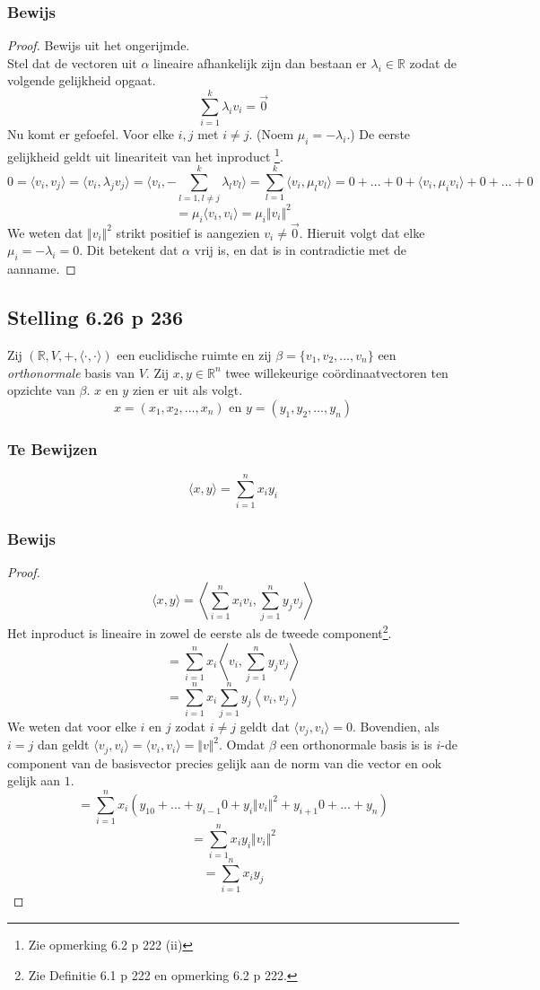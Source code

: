 \documentclass[lineaire_algebra_oplossingen.tex]{subfiles}
\begin{document}
\subsubsection*{Bewijs}
\begin{proof}
Bewijs uit het ongerijmde.\\
Stel dat de vectoren uit $\alpha$ lineaire afhankelijk zijn dan bestaan er $\lambda_i \in \mathbb{R}$ zodat de volgende gelijkheid opgaat.
\[
\sum_{i=1}^k \lambda_iv_i = \vec{0}
\]
Nu komt er gefoefel. Voor elke $i, j$ met $i\neq j$. (Noem $\mu_i =-\lambda_i $.)
De eerste gelijkheid geldt uit lineariteit van het inproduct \footnote{Zie opmerking 6.2 p 222 (ii)}.
\[
0 = \langle v_i, v_j \rangle = \langle v_i, \lambda_jv_j \rangle = \langle v_i, -\sum_{l=1, l\neq j}^k \lambda_lv_l \rangle = \sum_{l= 1}^k\langle v_i, \mu_lv_l\rangle = 0 + ... + 0 + \langle v_i,\mu_i v_i\rangle + 0 + ... + 0
\]
\[
= \mu_i \langle v_i,v_i\rangle = \mu_i \Vert v_i\Vert^2
\]
We weten dat $\Vert v_i\Vert^2$ strikt positief is aangezien $v_i \neq \vec{0}$. Hieruit volgt dat elke $\mu_i = -\lambda_i = 0$. Dit betekent dat $\alpha$ vrij is, en dat is in contradictie met de aanname.
\end{proof}

\subsection{Stelling 6.26 p 236}
Zij $(\mathbb{R}, V,+, \langle \cdot,\cdot \rangle)$ een euclidische ruimte en zij $\beta = \{v_1,v_2,...,v_n\}$ een \emph{orthonormale} basis van $V$. Zij $x,y\in \mathbb{R}^n$ twee willekeurige coördinaatvectoren ten opzichte van $\beta$. $x$ en $y$ zien er uit als volgt.
\[
x = (x_1,x_2,...,x_n) \text { en } y = (y_1,y_2,...,y_n)
\]
\subsubsection*{Te Bewijzen}
\[
\langle x,y\rangle = \sum_{i=1}^nx_iy_i
\]
\subsubsection*{Bewijs}
\begin{proof}
\[
\langle x,y\rangle = \left\langle \sum_{i=1}^nx_iv_i,\sum_{j=1}^ny_jv_j \right\rangle
\]
Het inproduct is lineaire in zowel de eerste als de tweede component\footnote{Zie Definitie 6.1 p 222 en opmerking 6.2 p 222.}.
\[
= \sum_{i=1}^nx_i \left\langle v_i,\sum_{j=1}^ny_jv_j \right\rangle
\]
\[
= \sum_{i=1}^nx_i \sum_{j=1}^n y_j \left\langle v_i,v_j \right\rangle
\]
We weten dat voor elke $i$ en $j$ zodat $i\neq j$ geldt dat $\langle v_j, v_i \rangle = 0$. Bovendien, als $i=j$ dan geldt $\langle v_j, v_i \rangle = \langle v_i, v_i \rangle = \Vert v\Vert^2$.
Omdat $\beta$ een orthonormale basis is is $i$-de component van de basisvector precies gelijk aan de norm van die vector en ook gelijk aan $1$. 
\[
= \sum_{i=1}^nx_i  (y_10+...+y_{i-1}0+y_i\Vert v_i\Vert^2+y_{i+1}0+...+y_n)
\]
\[
= \sum_{i=1}^n x_i y_i \Vert v_i\Vert^2
\]
\[
= \sum_{i=1}^nx_i y_j
\]
\end{proof}
\end{document}
